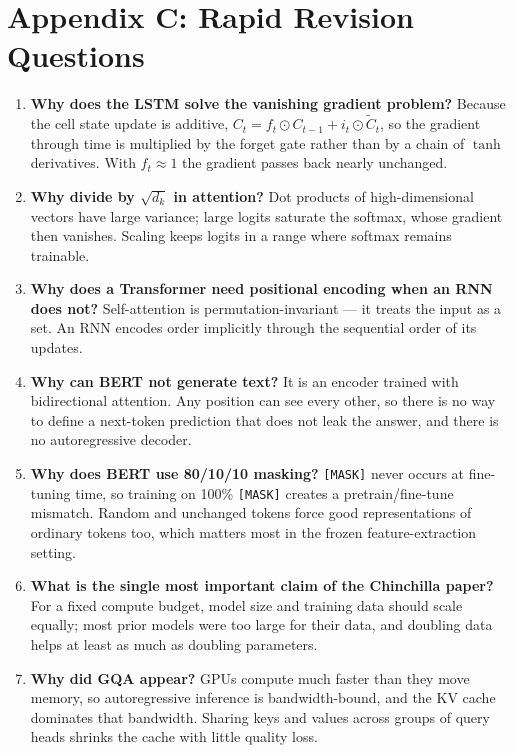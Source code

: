 \documentclass[11pt,a4paper]{article}
\begin{document}
\section{Appendix C: Rapid Revision Questions}

\begin{enumerate}
\item \textbf{Why does the LSTM solve the vanishing gradient problem?} Because the cell state
  update is additive, $C_t = f_t \odot C_{t-1} + i_t \odot \tilde C_t$, so the gradient through
  time is multiplied by the forget gate rather than by a chain of $\tanh$ derivatives. With
  $f_t \approx 1$ the gradient passes back nearly unchanged.

\item \textbf{Why divide by $\sqrt{d_k}$ in attention?} Dot products of high-dimensional
  vectors have large variance; large logits saturate the softmax, whose gradient then vanishes.
  Scaling keeps logits in a range where softmax remains trainable.

\item \textbf{Why does a Transformer need positional encoding when an RNN does not?}
  Self-attention is permutation-invariant --- it treats the input as a set. An RNN encodes
  order implicitly through the sequential order of its updates.

\item \textbf{Why can BERT not generate text?} It is an encoder trained with bidirectional
  attention. Any position can see every other, so there is no way to define a next-token
  prediction that does not leak the answer, and there is no autoregressive decoder.

\item \textbf{Why does BERT use 80/10/10 masking?} \texttt{[MASK]} never occurs at fine-tuning
  time, so training on 100\% \texttt{[MASK]} creates a pretrain/fine-tune mismatch. Random and
  unchanged tokens force good representations of ordinary tokens too, which matters most in the
  frozen feature-extraction setting.

\item \textbf{What is the single most important claim of the Chinchilla paper?} For a fixed
  compute budget, model size and training data should scale equally; most prior models were
  too large for their data, and doubling data helps at least as much as doubling parameters.

\item \textbf{Why did GQA appear?} GPUs compute much faster than they move memory, so
  autoregressive inference is bandwidth-bound, and the KV cache dominates that bandwidth.
  Sharing keys and values across groups of query heads shrinks the cache with little quality
  loss.


\end{enumerate}
\end{document}

